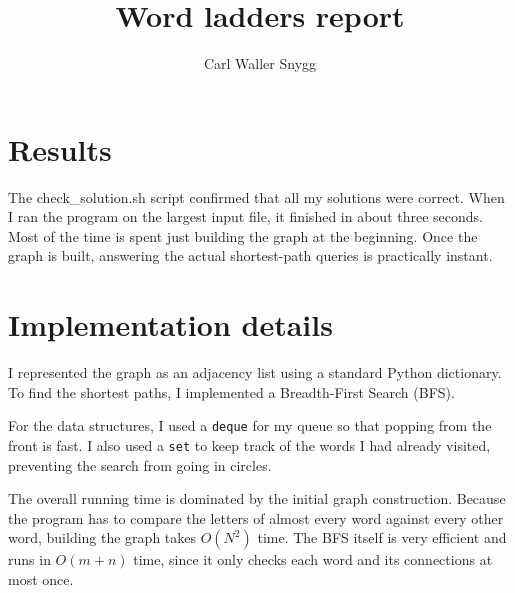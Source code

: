 \documentclass{article}
\title{Word ladders report}
\author{Carl Waller Snygg}
\begin{document}
  \maketitle

  \section{Results}
  The check\_solution.sh script confirmed that all my solutions were correct. When I ran the program on the largest input file, it finished in about three seconds. Most of the time is spent just building the graph at the beginning. Once the graph is built, answering the actual shortest-path queries is practically instant.

  \section{Implementation details}
  I represented the graph as an adjacency list using a standard Python dictionary. To find the shortest paths, I implemented a Breadth-First Search (BFS). 
  
  For the data structures, I used a \texttt{deque} for my queue so that popping from the front is fast. I also used a \texttt{set} to keep track of the words I had already visited, preventing the search from going in circles. 
  
  The overall running time is dominated by the initial graph construction. Because the program has to compare the letters of almost every word against every other word, building the graph takes $O(N^2)$ time. The BFS itself is very efficient and runs in $O(m +n)$ time, since it only checks each word and its connections at most once.
\end{document}
